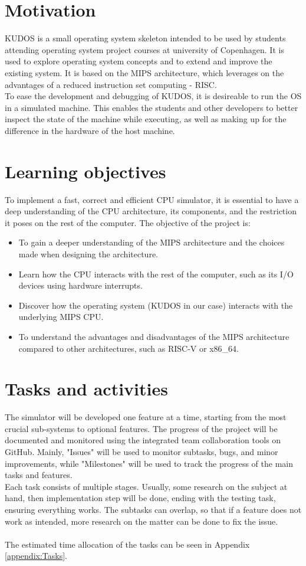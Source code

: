 \documentclass[11pt]{article}
\begin{document}
\section{Motivation}
KUDOS is a small operating system skeleton intended to be used by students
attending operating system project courses at university of Copenhagen.
It is used to explore operating system concepts and to extend and improve the
existing system.
It is based on the MIPS architecture, which leverages on the advantages of a
reduced instruction set computing - RISC.\\
To ease the development and debugging of KUDOS, it is desireable to run the OS
in a simulated machine. This enables the students and other developers to
better inspect the state of the machine while executing, as well as making up
for the difference in the hardware of the host machine.

\section{Learning objectives}
To implement a fast, correct and efficient CPU simulator, it is essential
to have a deep understanding of the CPU architecture, its components, and
the restriction it poses on the rest of the computer.
The objective of the project is:
\begin{itemize}
\item To gain a deeper understanding of the MIPS architecture and the choices
made when
designing the architecture.
\item Learn how the CPU interacts with the rest of the computer, such as
its I/O devices using hardware interrupts.
\item Discover how the operating system (KUDOS in our case) interacts with the 
underlying MIPS CPU.
\item To understand the advantages and disadvantages of the MIPS architecture
compared to other architectures, such as RISC-V or x86\_64.
\end{itemize}

\section{Tasks and activities}
The simulator will be developed one feature at a time, starting from the
most crucial sub-systems to optional features. The progress of the project
will be documented and monitored  using the integrated team collaboration
tools on GitHub. Mainly, "Issues" will be used to monitor subtasks, bugs,
and minor improvements, while "Milestones" will be used to track the progress
of the main tasks and features.\\
Each task consists of multiple stages. Usually, some research
on the subject at hand, then implementation step will be done, ending with
the testing task, ensuring everything works. The subtasks can overlap, so
that if a feature does not work as intended, more research on the matter
can be done to fix the issue.\\\\
The estimated time allocation of the tasks can be seen in Appendix
\ref{appendix:Tasks}.
\end{document}
